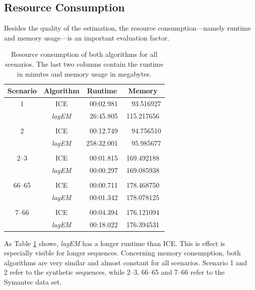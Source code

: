 \documentclass[conference]{IEEEtran}
\theoremstyle{examplestyle}
\begin{document}
\subsection{Resource Consumption}
Besides the quality of the estimation, the resource consumption---namely runtime and memory usage---is an important evaluation factor. 


\begin{table}[!tb]
	\centering
	\caption{Resource consumption of both algorithms for all scenarios. The last two columns contain the runtime in minutes and memory usage in megabytes.}
	\label{tbl:resources}

	\begin{tabular}{c c c c}
		\textbf{Scenario} & \textbf{Algorithm} & \textbf{Runtime} & \textbf{Memory} \\
		\hline
		1	& \ac{ICE}				&	~00:02.981	&	~~93.516927	\\
			& \textit{lagEM}		&	~26:45.805	&	115.217656	\\
		\\
		2	& \ac{ICE}				&	~00:12.749	&	~~94.756510	\\
			& \textit{lagEM}		&	258:32.001	&	~~95.985677	\\
		\hline
		\\
		2--3 & \ac{ICE}				&	~00:01.815	&	169.492188 \\
			&	\textit{lagEM}		&	~00:00.297	&	169.085938 \\
		\\
		66--65 & \ac{ICE}			&	~00:00.711	&	178.468750 \\
			&	\textit{lagEM}		&	~00:01.342	&	178.078125 \\
		\\
		7--66 & \ac{ICE}			&	~00:04.394	&	176.121094 \\
			&	\textit{lagEM}		&	~00:18.022	&	176.394531 \\
	\end{tabular}

\end{table}



As Table \ref{tbl:resources} shows, \textit{lagEM} has a longer runtime than \ac{ICE}. This is effect is especially visible for longer sequences. Concerning memory consumption, both algorithms are very similar and almost constant for all scenarios. Scenario 1 and 2 refer to the synthetic sequences, while 2--3, 66--65 and 7--66 refer to the Symantec data set.
\end{document}

